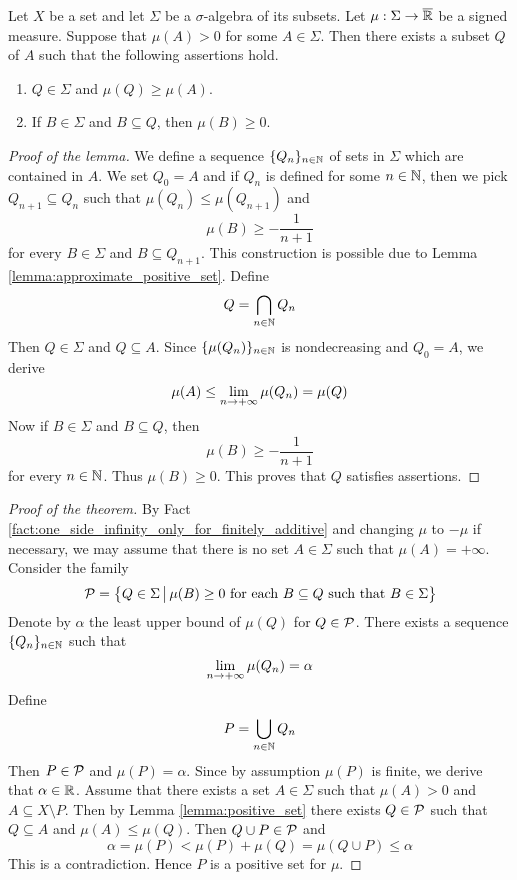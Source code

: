 \begin{lemma}\label{lemma:positive_set}
    Let $X$ be a set and let $\Sigma$ be a $\sigma$-algebra of its subsets. Let $\mu:\Sigma \rightarrow \overline{{\mathbb R}}$ be a signed measure. Suppose that $\mu(A) > 0$ for some $A \in \Sigma$. Then there exists a subset $Q$ of $A$ such that the following assertions hold.
    \begin{enumerate}[label=\emph{\textbf{(\arabic*)}}, leftmargin=3.0em]
        \item $Q \in \Sigma$ and $\mu(Q) \geq \mu(A)$.
        \item If $B \in \Sigma$ and $B \subseteq Q$, then $\mu(B) \geq 0$.
    \end{enumerate}
\end{lemma}
\begin{proof}[Proof of the lemma]
    We define a sequence $\{Q_n\}_{n\in {\mathbb N}}$ of sets in $\Sigma$ which are contained in $A$. We set $Q_0 = A$ and if $Q_n$ is defined for some $n \in {\mathbb N}$, then we pick $Q_{n+1} \subseteq Q_n$ such that $\mu(Q_n) \leq \mu(Q_{n+1})$ and
    $$\mu\left(B\right) \geq - \frac{1}{n+1}$$
    for every $B \in \Sigma$ and $B\subseteq Q_{n+1}$. This construction is possible due to Lemma \ref{lemma:approximate_positive_set}. Define
    $$Q = \bigcap_{n\in {\mathbb N}}Q_n$$
    Then $Q \in \Sigma$ and $Q\subseteq A$. Since $\{\mu(Q_n)\}_{n\in {\mathbb N}}$ is nondecreasing and $Q_0 = A$, we derive
    $$\mu(A) \leq \lim_{n\rightarrow +\infty}\mu(Q_n) = \mu(Q) $$
    Now if $B \in \Sigma$ and $B \subseteq Q$, then
    $$\mu(B) \geq -\frac{1}{n + 1}$$
    for every $n \in {\mathbb N}$. Thus $\mu(B) \geq 0$. This proves that $Q$ satisfies assertions.
\end{proof}

\begin{proof}[Proof of the theorem]
    By Fact \ref{fact:one_side_infinity_only_for_finitely_additive} and changing $\mu$ to $-\mu$ if necessary, we may assume that there is no set $A \in \Sigma$ such that $\mu(A) = +\infty$. Consider the family
    $${\mathcal P} = \big\{Q \in \Sigma\,\big|\,\mu(B)\geq 0\mbox{ for each }B\subseteq Q\mbox{ such that }B \in \Sigma\big\}$$
    Denote by $\alpha$ the least upper bound of $\mu(Q)$ for $Q \in {\mathcal P}$. There exists a sequence $\{Q_n\}_{n\in {\mathbb N}}$ such that
    $$\lim_{n\rightarrow +\infty}\mu(Q_n) = \alpha$$
    Define
    $$P = \bigcup_{n\in {\mathbb N}}Q_n$$
    Then $P \in {\mathcal P}$ and $\mu(P) = \alpha$. Since by assumption $\mu(P)$ is finite, we derive that $\alpha \in {\mathbb R}$. Assume that there exists a set $A \in \Sigma$ such that $\mu(A) > 0$ and $A \subseteq X\setminus P$. Then by Lemma \ref{lemma:positive_set} there exists $Q \in {\mathcal P}$ such that $Q \subseteq A$ and $\mu(A) \leq \mu(Q)$. Then $Q\cup P \in {\mathcal P}$ and
    $$\alpha = \mu(P) < \mu(P) + \mu(Q) = \mu(Q\cup P) \leq \alpha$$
    This is a contradiction. Hence $P$ is a positive set for $\mu$.
\end{proof}

